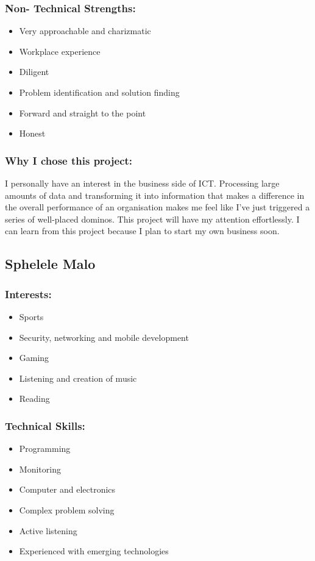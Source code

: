 \subsubsection{Non- Technical Strengths:}
\begin{itemize}
	\item Very approachable and charizmatic
	\item Workplace experience
	\item Diligent
	\item Problem identification and solution finding
	\item Forward and straight to the point
	\item Honest
\end{itemize}

\subsubsection{Why I chose this project:}
\par{I personally have an interest in the business side of ICT. Processing large amounts of data and transforming it into information that makes a difference in the overall performance of an organisation makes me feel like I've just triggered a series of well-placed dominos. This project will have my attention effortlessly. I can learn from this project because I plan to start my own business soon.}

\newpage
\subsection{Sphelele Malo}
\subsubsection{Interests:}
	\begin{itemize}
		\item Sports
		\item Security, networking and mobile development
		\item Gaming
		\item Listening and creation of music 
		\item Reading 
	\end{itemize}
\subsubsection{Technical Skills:}
	\begin{itemize}
		\item Programming
		\item Monitoring
		\item Computer and electronics 
		\item Complex problem solving
		\item Active listening
		\item Experienced with emerging technologies 
	\end{itemize}
	
